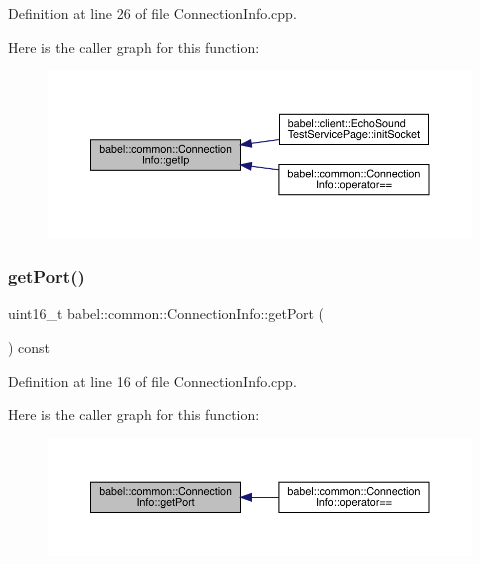 Definition at line 26 of file Connection\+Info.\+cpp.

Here is the caller graph for this function\+:\nopagebreak
\begin{figure}[H]
\begin{center}
\leavevmode
\includegraphics[width=350pt]{classbabel_1_1common_1_1_connection_info_a218d1756c060abaaa9d2390f65031f66_icgraph}
\end{center}
\end{figure}
\mbox{\label{classbabel_1_1common_1_1_connection_info_a2acb011dd3842a456d67a5a451351ac6}} 
\subsubsection{\texorpdfstring{get\+Port()}{getPort()}}
{\footnotesize\ttfamily uint16\+\_\+t babel\+::common\+::\+Connection\+Info\+::get\+Port (\begin{DoxyParamCaption}{ }\end{DoxyParamCaption}) const}



Definition at line 16 of file Connection\+Info.\+cpp.

Here is the caller graph for this function\+:\nopagebreak
\begin{figure}[H]
\begin{center}
\leavevmode
\includegraphics[width=350pt]{classbabel_1_1common_1_1_connection_info_a2acb011dd3842a456d67a5a451351ac6_icgraph}
\end{center}
\end{figure}
\mbox{\label{classbabel_1_1common_1_1_connection_info_a14e3781b12f38af2365f021b9b83fef8}} 
